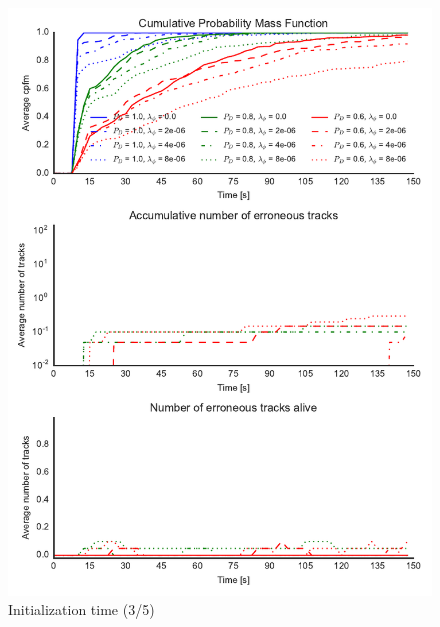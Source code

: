 \begin{figure}
\centering
\includegraphics{Figures/plots/Scenario1_Init-Time(3-5).pdf}
\caption{Initialization time (3/5)}\label{fig:init_time_3-5}
\end{figure}


